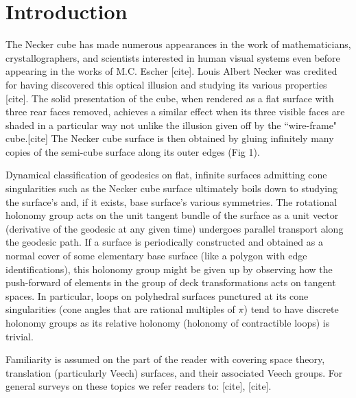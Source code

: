 \documentclass[]{article}
\begin{document}
\section{Introduction}
The Necker cube has made numerous appearances in the work of mathematicians, crystallographers, and scientists interested in human visual systems even before appearing in the works of M.C. Escher [cite]. Louis Albert Necker was credited for having discovered this optical illusion and studying its various properties [cite]. The solid presentation of the cube, when rendered as a flat surface with three rear faces removed, achieves a similar effect when its three visible faces are shaded in a particular way not unlike the illusion given off by the ``wire-frame" cube.[cite] The Necker cube surface is then obtained by gluing infinitely many copies of the semi-cube surface along its outer edges (Fig 1).


Dynamical classification of geodesics on flat, infinite surfaces admitting cone singularities such as the Necker cube surface ultimately boils down to studying the surface's and, if it exists, base surface's various symmetries. The rotational holonomy group acts on the unit tangent bundle of the surface as a unit vector (derivative of the geodesic at any given time) undergoes parallel transport along the geodesic path. If a surface is periodically constructed and obtained as a normal cover of some elementary base surface (like a polygon with edge identifications), this holonomy group might be given up by observing how the push-forward of elements in the group of deck transformations acts on tangent spaces. In particular, loops on polyhedral surfaces punctured at its  cone singularities (cone angles that are rational multiples of $\pi$) tend to have discrete holonomy groups as its relative holonomy (holonomy of contractible loops) is trivial.

\begin{rem}
Familiarity is assumed on the part of the reader with covering space theory, translation (particularly Veech) surfaces, and their associated Veech groups. For general surveys on these topics we refer readers to: [cite], [cite].
\end{rem}
\end{document}

